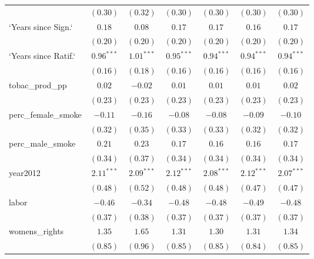 \begin{table}[!h]
\begin{center}
\begin{tabular}{l c c c c c c }
                        & $(0.30)$     & $(0.32)$     & $(0.30)$     & $(0.30)$     & $(0.30)$     & $(0.30)$     \\
`Years since Sign.`     & $0.18$       & $0.08$       & $0.17$       & $0.17$       & $0.16$       & $0.17$       \\
                        & $(0.20)$     & $(0.20)$     & $(0.20)$     & $(0.20)$     & $(0.20)$     & $(0.20)$     \\
`Years since Ratif.`    & $0.96^{***}$ & $1.01^{***}$ & $0.95^{***}$ & $0.94^{***}$ & $0.94^{***}$ & $0.94^{***}$ \\
                        & $(0.16)$     & $(0.18)$     & $(0.16)$     & $(0.16)$     & $(0.16)$     & $(0.16)$     \\
tobac\_prod\_pp         & $0.02$       & $-0.02$      & $0.01$       & $0.01$       & $0.01$       & $0.02$       \\
                        & $(0.23)$     & $(0.23)$     & $(0.23)$     & $(0.23)$     & $(0.23)$     & $(0.23)$     \\
perc\_female\_smoke     & $-0.11$      & $-0.16$      & $-0.08$      & $-0.08$      & $-0.09$      & $-0.10$      \\
                        & $(0.32)$     & $(0.35)$     & $(0.33)$     & $(0.33)$     & $(0.32)$     & $(0.32)$     \\
perc\_male\_smoke       & $0.21$       & $0.23$       & $0.17$       & $0.16$       & $0.16$       & $0.17$       \\
                        & $(0.34)$     & $(0.37)$     & $(0.34)$     & $(0.34)$     & $(0.34)$     & $(0.34)$     \\
year2012                & $2.11^{***}$ & $2.09^{***}$ & $2.12^{***}$ & $2.08^{***}$ & $2.12^{***}$ & $2.07^{***}$ \\
                        & $(0.48)$     & $(0.52)$     & $(0.48)$     & $(0.48)$     & $(0.47)$     & $(0.47)$     \\
labor                   & $-0.46$      & $-0.34$      & $-0.48$      & $-0.48$      & $-0.49$      & $-0.48$      \\
                        & $(0.37)$     & $(0.38)$     & $(0.37)$     & $(0.37)$     & $(0.37)$     & $(0.37)$     \\
womens\_rights          & $1.35$       & $1.65$       & $1.31$       & $1.30$       & $1.31$       & $1.34$       \\
                        & $(0.85)$     & $(0.96)$     & $(0.85)$     & $(0.85)$     & $(0.84)$     & $(0.85)$     \\

\end{tabular}
\end{center}
\end{table}
